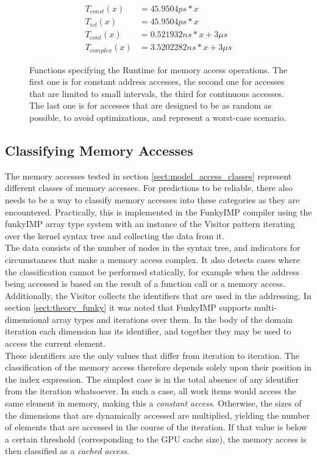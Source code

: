 \begin{figure}
	\label{fig:model_access_classes_eqs}
	\begin{align*}
		T_{const}(x) &= 45.9504ps * x\\
        T_{ivl}(x) &= 45.9504ps * x\\
        T_{cont}(x) &= 0.521932ns * x + 3\mu s\\
        T_{complex}(x) &= 3.5202282ns * x + 3\mu s
	\end{align*}
	\caption{Functions specifying the Runtime for memory access operations. The first one is for constant address accesses, the second one for accesses that are limited to small intervals, the third for continuous accesses. The last one is for accesses that are designed to be as random as possible, to avoid optimizations, and represent a worst-case scenario.} 
\end{figure}

\subsection{Classifying Memory Accesses}
\label{sect:model_access_classifying}
The memory accesses tested in section \ref{sect:model_access_classes} represent different classes of memory accesses. For predictions to be reliable, there also needs to be a way to classify memory accesses into these categories as they are encountered. Practically, this is implemented in the FunkyIMP compiler using the funkyIMP array type system with an instance of the Visitor pattern iterating over the kernel syntax tree and collecting the data from it. \\

The data consists of the number of nodes in the syntax tree, and indicators for circumstances that make a memory access complex. It also detects cases where the classification cannot be performed statically, for example when the address being accessed is based on the result of a function call or a memory access. Additionally, the Visitor collects the identifiers that are used in the addressing. In section \ref{sect:theory_funky} it was noted that FunkyIMP supports multi-dimensional array types and iterations over them. In the body of the domain iteration each dimension has its identifier, and together they may be used to access the current element. \\

These identifiers are the only values that differ from iteration to iteration. The classification of the memory access therefore depends solely upon their position in the index expression. The simplest case is in the total absence of any identifier from the iteration whatsoever. In such a case, all work items would access the same element in memory, making this a \textit{constant access}. Otherwise, the sizes of the dimensions that are dynamically accessed are multiplied, yielding the number of elements that are accessed in the course of the iteration. If that value is below a certain threshold (corresponding to the GPU cache size), the memory access is then classified as a \textit{cached access}. \\


